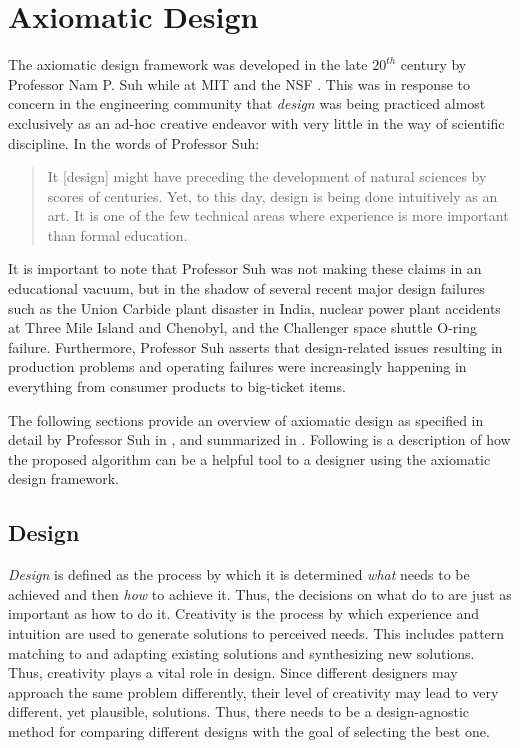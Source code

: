 \section{Axiomatic Design}

The axiomatic design framework was developed in the late \(20^{th}\) century by Professor Nam P. Suh while at MIT
and the NSF \cite{suh}.  This was in response to concern in the engineering community that \emph{design} was being
practiced almost exclusively as an ad-hoc creative endeavor with very little in the way of scientific discipline.
In the words of Professor Suh:
\begin{quote}
  It [design] might have preceding the development of natural sciences by scores of centuries.  Yet, to this day,
  design is being done intuitively as an art.  It is one of the few technical areas where experience is more
  important than formal education.
\end{quote}
It is important to note that Professor Suh was not making these claims in an educational vacuum, but in the shadow
of several recent major design failures such as the Union Carbide plant disaster in India, nuclear power plant
accidents at Three Mile Island and Chenobyl, and the Challenger space shuttle O-ring failure.  Furthermore,
Professor Suh asserts that design-related issues resulting in production problems and operating failures were
increasingly happening in everything from consumer products to big-ticket items.

The following sections provide an overview of axiomatic design as specified in detail by Professor Suh in \cite{suh},
and summarized in \cite{cavallaro,jahanbekam,suh2}.  Following is a description of how the proposed algorithm can be
a helpful tool to a designer using the axiomatic design framework.

\subsection{Design}

\emph{Design} is defined as the process by which it is determined \emph{what} needs to be achieved and then
\emph{how} to achieve it.  Thus, the decisions on what do to are just as important as how to do it.  Creativity is
the process by which experience and intuition are used to generate solutions to perceived needs.  This includes
pattern matching to and adapting existing solutions and synthesizing new solutions.  Thus, creativity plays a vital
role in design.  Since different designers may approach the same problem differently, their level of creativity may
lead to very different, yet plausible, solutions.  Thus, there needs to be a design-agnostic method for comparing
different designs with the goal of selecting the best one.

